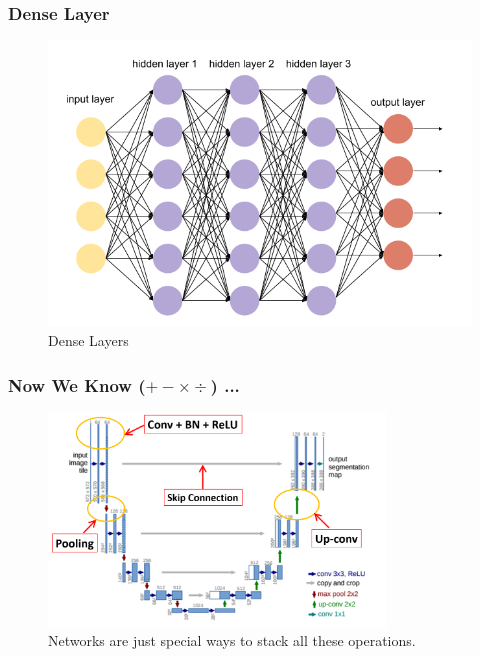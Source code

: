 \documentclass[10pt]{beamer}
\begin{document}
\begin{frame}
\frametitle{Dense Layer}
	\begin{figure}[H]
	\centerline{
		\includegraphics[width=1\textwidth]{denselayer.png}
	}
	\caption{Dense Layers}
\end{figure}
\end{frame}
\begin{frame}
\frametitle{Now We Know ($+-\times \div$) ...}
	\begin{figure}[H]
	\centerline{
		\includegraphics[width=0.8\textwidth]{unet_detailed.png}
	}
	\caption{Networks are just special ways to stack all these operations.}
\end{figure}
\end{frame}
\end{document}
